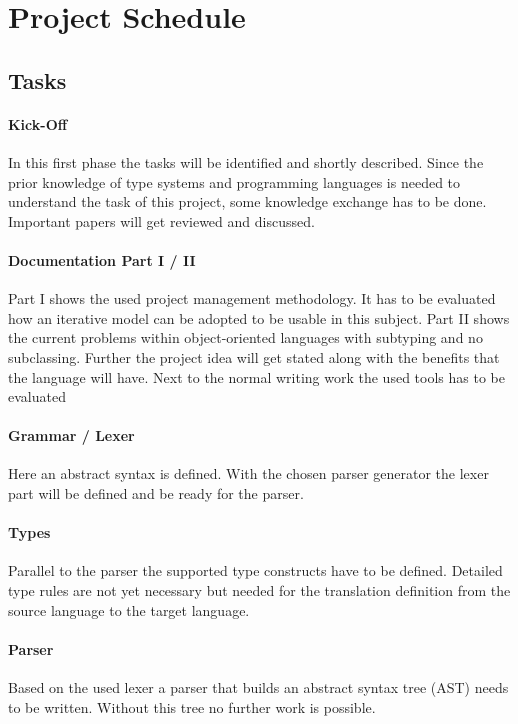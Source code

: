 \section{Project Schedule}
\subsection{Tasks}
\paragraph{Kick-Off}
In this first phase the tasks will be identified and shortly
described. Since the prior knowledge of type systems and programming
languages is needed to understand the task of this project, some
knowledge exchange has to be done. Important papers will get reviewed
and discussed.

\paragraph{Documentation Part I / II}
Part I shows the used project management methodology. It has to be
evaluated how an iterative model can be adopted to be usable in this
subject. Part II shows the current problems within object-oriented
languages with subtyping and no subclassing. Further the project idea
will get stated along with the benefits that the language will have. Next
to the normal writing work the used tools has to be evaluated

\paragraph{Grammar / Lexer}
Here an abstract syntax is defined. With the chosen parser generator
the lexer part will be defined and be ready for the parser.

\paragraph{Types}
Parallel to the parser the supported type constructs have to be
defined. Detailed type rules are not yet necessary but needed for the
translation definition from the source language to the target language.

\paragraph{Parser}
Based on the used lexer a parser that builds an abstract syntax tree
(AST) needs to be written. Without this tree no further work is possible.

